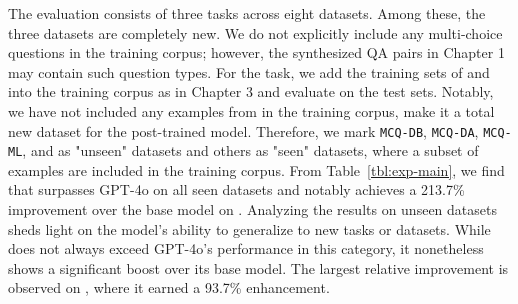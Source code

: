 The evaluation consists of three tasks across eight datasets. Among these, the three \mmlu datasets are completely new. We do not explicitly include any multi-choice questions in the training corpus; however, the synthesized QA pairs in Chapter 1 may contain such question types. For the \datadiscovery task, we add the training sets of \birdselect and \openwikiselect into the training corpus as in Chapter 3 and evaluate on the test sets. Notably, we have not included any examples from \wikipage in the training corpus, make it a total new dataset for the post-trained model. Therefore, we mark \texttt{MCQ-DB}, \texttt{MCQ-DA}, \texttt{MCQ-ML}, and \wikipage as "unseen" datasets and others as "seen" datasets, where a subset of examples are included in the training corpus.
%
From Table~\ref{tbl:exp-main}, we find that  \modelname surpasses GPT-4o on all seen datasets and notably achieves a 213.7\% improvement over the base model on \openwikiselect. Analyzing the results on unseen datasets sheds light on the model's ability to generalize to new tasks or datasets. While \modelname does not always exceed GPT-4o's performance in this category, it nonetheless shows a significant boost over its base model. The largest relative improvement is observed on \wikipage, where it earned a 93.7\% enhancement.
